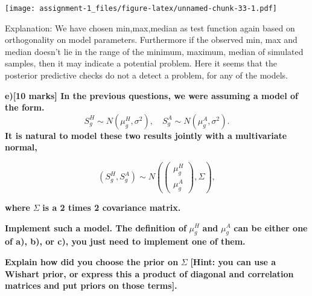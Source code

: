 \documentclass[
]{article}
\newenvironment{Shaded}{\begin{snugshade}}{\end{snugshade}}
\newcommand{\AttributeTok}[1]{\textcolor[rgb]{0.77,0.63,0.00}{#1}}
\newcommand{\DecValTok}[1]{\textcolor[rgb]{0.00,0.00,0.81}{#1}}
\newcommand{\FunctionTok}[1]{\textcolor[rgb]{0.00,0.00,0.00}{#1}}
\newcommand{\NormalTok}[1]{#1}
\newcommand{\SpecialCharTok}[1]{\textcolor[rgb]{0.00,0.00,0.00}{#1}}
\newcommand{\StringTok}[1]{\textcolor[rgb]{0.31,0.60,0.02}{#1}}
\begin{document}
\begin{Shaded}
\end{Shaded}

\texttt{[image: assignment-1\_files/figure-latex/unnamed-chunk-33-1.pdf]}

Explanation: We have chosen min,max,median as test function again based
on orthogonality on model parameters. Furthermore if the observed min,
max and median doesn't lie in the range of the minimum, maximum, median
of simulated samples, then it may indicate a potential problem. Here it
seems that the posterior predictive checks do not a detect a problem,
for any of the models.

\textbf{e){[}10 marks{]} In the previous questions, we were assuming a
model of the
form.}\[S_g^{H}\sim N(\mu_{g}^{H},\sigma^2), \quad S_g^{A}\sim N(\mu_{g}^{A}, \sigma^2).\]\textbf{It
is natural to model these two results jointly with a multivariate
normal,}

\[(S_g^{H}, S_g^{A})\sim N\left(\left(\begin{matrix}\mu_{g}^{H}\\\mu_{g}^{A}\end{matrix}\right),\Sigma\right),\]

\textbf{where} \(\Sigma\) \textbf{is a 2 times 2 covariance matrix.}

\textbf{Implement such a model. The definition of} \(\mu_g^{H}\)
\textbf{and} \(\mu_g^{A}\) \textbf{can be either one of a), b), or c),
you just need to implement one of them.}

\textbf{Explain how did you choose the prior on} \(\Sigma\)
\textbf{{[}Hint: you can use a Wishart prior, or express this a product
of diagonal and correlation matrices and put priors on those terms{]}.}
\end{document}
